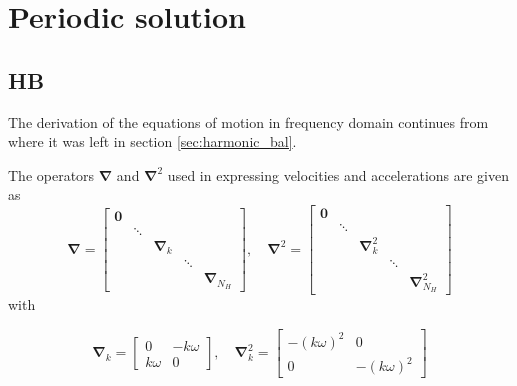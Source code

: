
\chapter{Periodic solution}
\label{chap:per_sol}

\section{HB}
\label{sec:hb_appendix}

The derivation of the equations of motion in frequency domain continues from
where it was left in section \ref{sec:harmonic_bal}.

The operators $\bm \nabla$ and $\bm \nabla^2$ used in expressing velocities and
accelerations are given as
\begin{equation}
  \label{eq:hb_nabla}
  \bm \nabla =
  \begin{bmatrix}
    \bm 0 &        &                &        & \\
          & \ddots &                &        & \\
          &        & \bm \nabla_k   &        & \\
          &        &                & \ddots & \\
          &        &                &        & \bm \nabla_{N_H}
  \end{bmatrix}, \quad
  \bm \nabla^2 =
  \begin{bmatrix}
    \bm 0 &        &                &        & \\
          & \ddots &                &        & \\
          &        & \bm \nabla^2_k &        & \\
          &        &                & \ddots & \\
          &        &                &        & \bm \nabla^2_{N_H}
  \end{bmatrix}
\end{equation}
with

\begin{equation}
  \label{eq:hb_nabla2}
  \bm \nabla_k =
  \begin{bmatrix}
    0       & -k\omega \\
    k\omega & 0
  \end{bmatrix}, \quad
  \bm \nabla^2_k =
  \begin{bmatrix}
    -(k\omega)^2 & 0 \\
    0            & -(k\omega)^2
  \end{bmatrix}
\end{equation}

